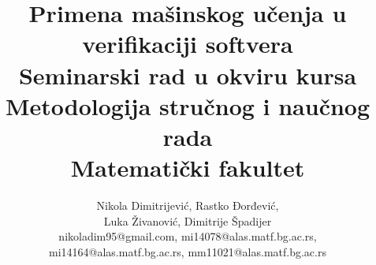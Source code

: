 \documentclass[a4paper]{article}
\begin{document}

\title{Primena mašinskog učenja u verifikaciji softvera\\ \small{Seminarski rad u okviru kursa\\Metodologija stručnog i naučnog rada\\ Matematički fakultet}}

\author{Nikola Dimitrijević, Rastko Đorđević,\\
 Luka Živanović, Dimitrije Špadijer\\
 nikoladim95@gmail.com, mi14078@alas.matf.bg.ac.rs,\\
  mi14164@alas.matf.bg.ac.rs, mm11021@alas.matf.bg.ac.rs}
\vspace*{-3cm}
    {\let\newpage\relax\maketitle}
\end{document}
